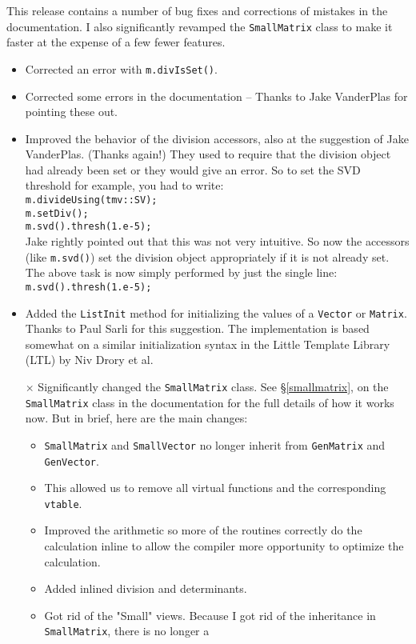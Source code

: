 \documentclass[twoside,letterpaper,11pt]{article}
\renewcommand{\tt}[1]{{\lstinline {#1}}}
\begin{document}
\begin{description}
This release contains a number of bug fixes and corrections of mistakes in the documentation.
I also significantly revamped the \tt{SmallMatrix} class to make it faster at the expense of a few fewer 
features.  
\begin{itemize}
\item
Corrected an error with \tt{m.divIsSet()}.
\item
Corrected some errors in the documentation -- Thanks to Jake VanderPlas for pointing these out.
\item
Improved the behavior of the division accessors, also at the suggestion of Jake VanderPlas. (Thanks again!)  They used to require that the division
object had already been set or they would give an error.  So to set the SVD threshold for example,
you had to write:\\
\tt{m.divideUsing(tmv::SV);}\\
\tt{m.setDiv();}\\
\tt{m.svd().thresh(1.e-5);}\\
Jake rightly pointed out that this was not very intuitive.  So now the accessors (like \tt{m.svd()}) set
the division object appropriately if it is not already set.  The above task is now simply performed
by just the single line:\\
\tt{m.svd().thresh(1.e-5);}
\item
Added the \tt{ListInit} method for initializing the values of a \tt{Vector} or \tt{Matrix}.  Thanks to Paul
Sarli for this suggestion.  The implementation is based somewhat on a similar 
initialization syntax in the Little Template Library (LTL) by Niv Drory et al.
\item[$\times$]
Significantly changed the \tt{SmallMatrix} class.  See \S\ref{smallmatrix}, on the \tt{SmallMatrix} class 
in the documentation
for the full details of how it works now.  But in brief, here are the main changes:
\begin{itemize}
\item \tt{SmallMatrix} and \tt{SmallVector} no longer inherit from \tt{GenMatrix} and \tt{GenVector}.
\item This allowed us to remove all virtual functions and the corresponding \tt{vtable}.
\item Improved the arithmetic so more of the routines correctly do the calculation inline to allow the
compiler more opportunity to optimize the calculation.
\item Added inlined division and determinants.
\item Got rid of the "Small" views.  Because I got rid of the inheritance in \tt{SmallMatrix}, there is no longer a 

\end{itemize}
\end{itemize}
\end{description}
\end{document}
